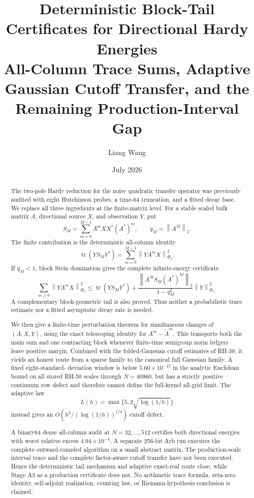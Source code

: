 \documentclass[11pt]{article}
\title{Deterministic Block-Tail Certificates for Directional Hardy Energies\\
\large All-Column Trace Sums, Adaptive Gaussian Cutoff Transfer, and the Remaining Production-Interval Gap}
\author{Liang Wang}
\date{July 2026}
\theoremstyle{remark}
\newcommand{\HS}{\mathfrak S_2}
\newcommand{\tr}{\operatorname{tr}}
\newcommand{\norm}[1]{\left\lVert #1\right\rVert}
\begin{document}
\maketitle

\begin{abstract}
The two-pole Hardy reduction for the noisy quadratic transfer operator was
previously audited with eight Hutchinson probes, a time-64 truncation, and a
fitted decay base.  We replace all three ingredients at the finite-matrix
level.  For a stable scaled bulk matrix \(A\), directional source \(X\), and
observation \(Y\), put
\[
 S_M=\sum_{m=0}^{M-1}A^mXX^*(A^*)^m,
 \qquad q_M=\norm{A^M}_2.
\]
The finite contribution is the deterministic all-column identity
\[
 \tr(YS_MY^*)=\sum_{m=0}^{M-1}\norm{YA^mX}_{\HS}^2.
\]
If \(q_M<1\), block Stein domination gives the complete infinite-energy
certificate
\[
 \sum_{m\ge0}\norm{YA^mX}_{\HS}^2
 \le \tr(YS_MY^*)+
 \frac{\norm{A^MS_M(A^*)^M}_2}{1-q_M^2}\norm Y_{\HS}^2.
\]
A complementary block-geometric tail is also proved.  Thus neither a
probabilistic trace estimate nor a fitted asymptotic decay rate is needed.

We then give a finite-time perturbation theorem for simultaneous changes of
\((A,X,Y)\), using the exact telescoping identity for
\(A^m-\widetilde A^m\).
This transports both the main sum and one contracting block whenever
finite-time semigroup norm ledgers leave positive margin.  Combined with the
folded-Gaussian cutoff estimates of RH-39, it yields an honest route from a
sparse family to the canonical full Gaussian family.  A fixed eight-standard-
deviation window is below \(5.60\times10^{-13}\) in the analytic Euclidean
bound on all stored RH-50 scales through \(N=40960\), but has a strictly
positive continuum row defect and therefore cannot define the full-kernel
all-grid limit.  The adaptive law
\[
 L(h)=\max\{5,2\sqrt{\log(1/h)}\}
\]
instead gives an \(O(h^2/(\log(1/h))^{1/4})\) cutoff defect.

A binary64 dense all-column audit at \(N=32,\ldots,512\) certifies both
directional energies with worst relative excess \(4.94\times10^{-4}\).  A
separate 256-bit Arb run executes the complete outward-rounded algorithm on a
small abstract matrix.  The production-scale interval trace and the complete
factor-aware cutoff transfer have not been executed.  Hence the deterministic
tail mechanism and adaptive exact-real route close, while Stage A3 as a
production certificate does not.  No arithmetic trace formula, zeta-zero
identity, self-adjoint realization, counting law, or Riemann-hypothesis
conclusion is claimed.
\end{abstract}
\end{document}
